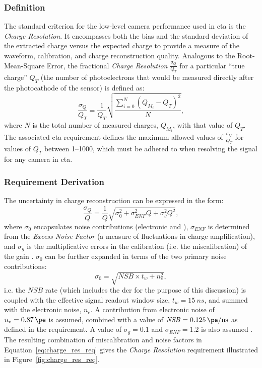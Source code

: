 \subsubsection{Definition}

The standard criterion for the low-level camera performance used in \gls{cta} is the \textit{Charge Resolution}. It encompasses both the bias and the standard deviation of the extracted charge versus the expected charge to provide a measure of the waveform, calibration, and charge reconstruction quality. Analogous to the Root-Mean-Square Error, the fractional \textit{Charge Resolution} $\frac{\sigma_Q}{Q_T}$ for a particular ``true charge'' $Q_T$ (the number of photoelectrons that would be measured directly after the photocathode of the sensor) is defined as:
\begin{equation} \label{eq:charge_res}
\frac{\sigma_Q}{Q_T} = \frac{1}{Q_T} \sqrt{\frac{\sum_{i=0}^N (Q_{M_i} - Q_T)^2}{N}},
\end{equation}
where $N$ is the total number of measured charges, $Q_{M_i}$, with that value of $Q_T$. The associated \gls{cta} requirement defines the maximum allowed values of $\frac{\sigma_Q}{Q_T}$ for values of $Q_T$ between \SIrange{1}{1000}{\pe}, which must be adhered to when resolving the signal for any camera in \gls{cta}.

\subsubsection{Requirement Derivation}

The uncertainty in charge reconstruction can be expressed in the form:
\begin{equation} \label{eq:charge_res_req}
\frac{\sigma_Q}{Q} = \frac{1}{Q} \sqrt{\sigma_0^2 + \sigma_{ENF}^2 Q + \sigma_g^2 Q^2},
\end{equation}
where $\sigma_0$ encapsulates noise contributions (electronic and ), $\sigma_{ENF}$ is determined from the \textit{Excess Noise Factor} (a measure of fluctuations in charge amplification), and $\sigma_g$ is the multiplicative errors in the calibration (i.e. the miscalibration) of the gain \cite{petophotons}\cite{Ohm2012}. $\sigma_0$ can be further expanded in terms of the two primary noise contributions:
\begin{equation} \label{eq:charge_res_nsb}
\sigma_0 = \sqrt{\mathit{NSB} \times t_w + n_e^2},
\end{equation}
i.e. the $\mathit{NSB}$ rate (which includes the \gls{dcr} for the purpose of this discussion) is coupled with the effective signal readout window size, $t_w = \SI{15}{ns}$, and summed with the electronic noise, $n_e$. A contribution from electronic noise of $n_e = \SI{0.87}{\pe}$ is assumed, combined with a value of $\mathit{NSB} = \SI{0.125}{\pe/ns}$ as defined in the requirement. A value of $\sigma_g = 0.1$ and $\sigma_{ENF} = 1.2$ is also assumed \cite{petophotons}. The resulting combination of miscalibration and noise factors in Equation~\ref{eq:charge_res_req} gives the \textit{Charge Resolution} requirement illustrated in Figure~\ref{fig:charge_res_req}.

